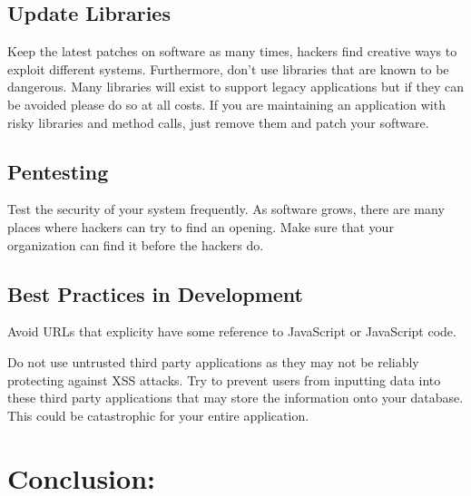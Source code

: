 \documentclass[conference]{IEEEtran}
\begin{document}
\subsection{Update Libraries}
Keep the latest patches on software as many times, hackers find creative ways to exploit different systems. Furthermore, don't use libraries that are known to be dangerous. Many libraries will exist to support legacy applications but if they can be avoided please do so at all costs. If you are maintaining an application with risky libraries and method calls, just remove them and patch your software.\\
\subsection{Pentesting}
Test the security of your system frequently. As software grows, there are many places where hackers can try to find an opening. Make sure that your organization can find it before the hackers do.

\subsection{Best Practices in Development} 
Avoid URLs that explicity have some reference to JavaScript or JavaScript code. 

Do not use untrusted third party applications as they may not be reliably protecting against XSS attacks. Try to prevent users from inputting data into these third party applications that may store the information onto your database. This could be catastrophic for your entire application.

\section{Conclusion:}
\end{document}
